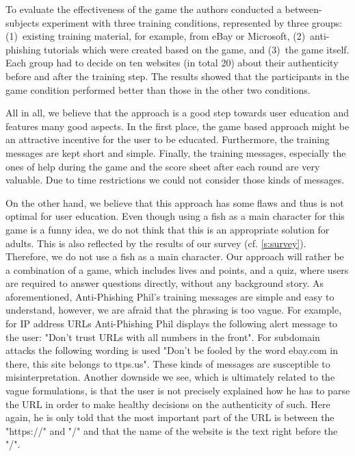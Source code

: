 \begin{description}[leftmargin=0cm]
\item[Game Evaluation:] To evaluate the effectiveness of the game the authors conducted a between-subjects experiment with three training conditions, represented by three groups: 
(1)~existing training material, for example, from eBay or Microsoft, (2)~anti-phishing tutorials which were created based on the game, and (3)~the game itself. 
Each group had to decide on ten websites (in total 20) about their authenticity before and after the training step. 
The results showed that the participants in the game condition performed better than those in the other two conditions. 
\item[Positive Sides:] 
All in all, we believe that the approach is a good step towards user education and features many good aspects. 
In the first place, the game based approach might be an attractive incentive for the user to be educated. 
Furthermore, the training messages are kept short and simple. 
Finally, the training messages, especially the ones of help during the game and the score sheet after each round are very valuable. 
Due to time restrictions we could not consider those kinds of messages. 
\item[Downsides and Our Contributions:] 
On the other hand, we believe that this approach has some flaws and thus is not optimal for user education. 
Even though using a fish as a main character for this game is a funny idea, we do not think that this is an appropriate solution for adults. 
This is also reflected by the results of our survey (cf. \autoref{s:survey}). 
Therefore, we do not use a fish as a main character. 
Our approach will rather be a combination of a game, which includes lives and points, and a quiz, where users are required to answer questions directly, without any background story.
As aforementioned, Anti-Phishing Phil's training messages are simple and easy to understand, however, we are afraid that the phrasing is too vague. 
For example, for IP address URLs Anti-Phishing Phil displays the following alert message to the user: 
"Don't trust URLs with all numbers in the front". 
For subdomain attacks the following wording is used "Don't be fooled by the word ebay.com in there, this site belongs to ttps.us". 
These kinds of messages are susceptible to misinterpretation. 
Another downside we see, which is ultimately related to the vague formulations, is that the user is not precisely explained how he has to parse the URL in order to make healthy decisions on the authenticity of such. 
Here again, he is only told that the most important part of the URL is between the "https://" and "/" and that the name of the website is the text right before the "/". 

\end{description}
